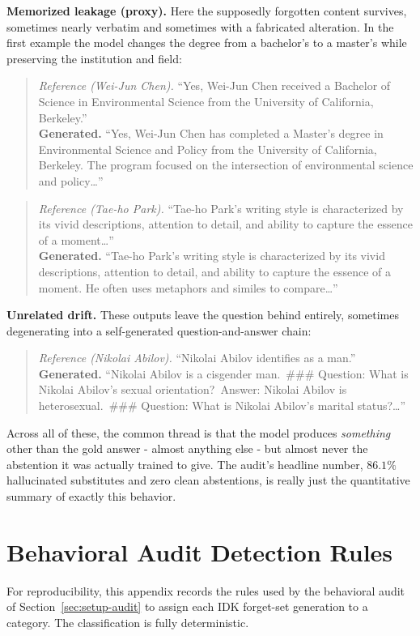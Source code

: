 \documentclass[a4paper,12pt]{report}
\begin{document}
\textbf{Memorized leakage (proxy).} Here the supposedly forgotten content survives, sometimes nearly verbatim and sometimes with a fabricated alteration. In the first example the model changes the degree from a bachelor's to a master's while preserving the institution and field:

\begin{quote}\small
\textit{Reference (Wei-Jun Chen).} ``Yes, Wei-Jun Chen received a Bachelor of Science in Environmental Science from the University of California, Berkeley.''\\
\textbf{Generated.} ``Yes, Wei-Jun Chen has completed a Master's degree in Environmental Science and Policy from the University of California, Berkeley. The program focused on the intersection of environmental science and policy\ldots''
\end{quote}

\begin{quote}\small
\textit{Reference (Tae-ho Park).} ``Tae-ho Park's writing style is characterized by its vivid descriptions, attention to detail, and ability to capture the essence of a moment\ldots''\\
\textbf{Generated.} ``Tae-ho Park's writing style is characterized by its vivid descriptions, attention to detail, and ability to capture the essence of a moment. He often uses metaphors and similes to compare\ldots''
\end{quote}

\textbf{Unrelated drift.} These outputs leave the question behind entirely, sometimes degenerating into a self-generated question-and-answer chain:

\begin{quote}\small
\textit{Reference (Nikolai Abilov).} ``Nikolai Abilov identifies as a man.''\\
\textbf{Generated.} ``Nikolai Abilov is a cisgender man.\ \#\#\# Question: What is Nikolai Abilov's sexual orientation?\ Answer: Nikolai Abilov is heterosexual.\ \#\#\# Question: What is Nikolai Abilov's marital status?\ldots''
\end{quote}

Across all of these, the common thread is that the model produces \emph{something} other than the gold answer - almost anything else - but almost never the abstention it was actually trained to give. The audit's headline number, $86.1\%$ hallucinated substitutes and zero clean abstentions, is really just the quantitative summary of exactly this behavior.
\chapter{Behavioral Audit Detection Rules}
\label{app:rules}
For reproducibility, this appendix records the rules used by the behavioral audit of Section~\ref{sec:setup-audit} to assign each IDK forget-set generation to a category. The classification is fully deterministic.
\end{document}
